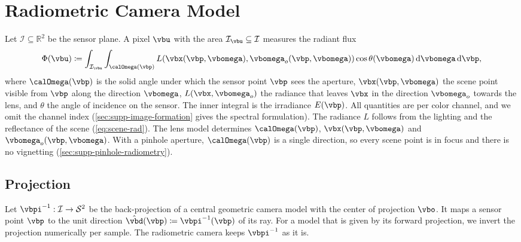 \section{Radiometric Camera Model}
\label{sec:radiometric-camera-model}
\label{sec:image-formation}
Let $\mathcal{I}\subseteq\mathbb{R}^2$ be the sensor plane. A pixel
$\vbu$ with the area $\mathcal{I}_{\vbu}\subseteq\mathcal{I}$ measures
the radiant flux~\cite{pharr2023physically}
\begin{equation}
\label{eq:per-channel-rad-flux}
    \Phi(\vbu) \coloneqq \int_{\mathcal{I}_{\vbu}}\int_{\calOmega(\vbp)} L(\vbx(\vbp,\vbomega), \vbomega_o(\vbp,\vbomega)) \cos\theta(\vbomega)\odif{\vbomega}\odif{\vbp},
\end{equation}
where $\calOmega(\vbp)$ is the solid angle under which the sensor
point $\vbp$ sees the aperture, $\vbx(\vbp,\vbomega)$ the scene point
visible from $\vbp$ along the direction $\vbomega$,
$L(\vbx,\vbomega_o)$ the radiance that leaves $\vbx$ in the direction
$\vbomega_o$ towards the lens, and $\theta$ the angle of incidence on
the sensor. The inner integral is the irradiance $E(\vbp)$. All
quantities are per color channel, and we omit the channel index
(\cref{sec:supp-image-formation} gives the spectral formulation). The
radiance $L$ follows from the lighting and the reflectance of the
scene (\cref{eq:scene-rad}). The lens model determines
$\calOmega(\vbp)$, $\vbx(\vbp,\vbomega)$ and $\vbomega_o(\vbp,\vbomega)$. With a pinhole aperture,
$\calOmega(\vbp)$ is a single direction, so every scene point is in
focus and there is no vignetting (\cref{sec:supp-pinhole-radiometry}).

\subsection{Projection}
Let $\vbpi^{-1}: \mathcal{I}\rightarrow\mathcal{S}^2$ be the
back-projection of a central geometric camera model with the center
of projection $\vbo$. It maps a sensor point $\vbp$ to the unit
direction $\hat{\vbd}(\vbp)\coloneqq\vbpi^{-1}(\vbp)$ of its ray. For
a model that is given by its forward projection, we invert the
projection numerically per sample. The radiometric camera keeps
$\vbpi^{-1}$ as it is.

